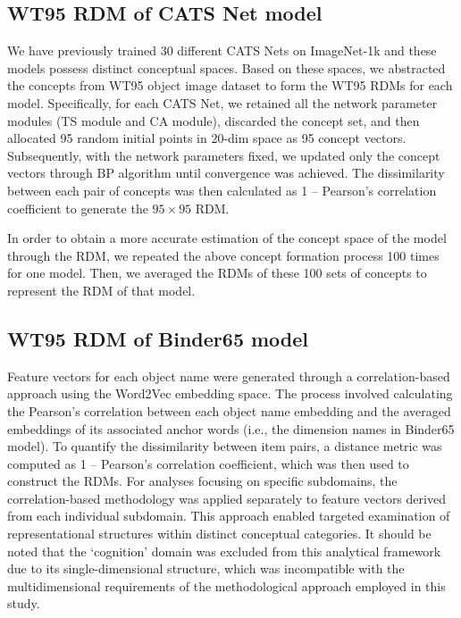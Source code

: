 \documentclass[pdflatex,sn-mathphys-num,lineno]{sn-jnl}%
\begin{document}
\begin{CJK}{UTF8}{gbsn}
\subsection{WT95 RDM of CATS Net model}
We have previously trained 30 different CATS Nets on ImageNet-1k and these models possess distinct conceptual spaces. Based on these spaces, we abstracted the concepts from WT95 object image dataset to form the WT95 RDMs for each model. Specifically, for each CATS Net, we retained all the network parameter modules (TS module and CA module), discarded the concept set, and then allocated 95 random initial points in 20-dim space as 95 concept vectors. Subsequently, with the network parameters fixed, we updated only the concept vectors through BP algorithm until convergence was achieved. The dissimilarity between each pair of concepts was then calculated as 1 – Pearson’s correlation coefficient to generate the $95\times95$ RDM. 

In order to obtain a more accurate estimation of the concept space of the model through the RDM, we repeated the above concept formation process 100 times for one model. Then, we averaged the RDMs of these 100 sets of concepts to represent the RDM of that model.

\subsection{WT95 RDM of Binder65 model}
Feature vectors for each object name were generated through a correlation-based approach using the Word2Vec embedding space. The process involved calculating the Pearson’s correlation between each object name embedding and the averaged embeddings of its associated anchor words (i.e., the dimension names in Binder65 model). To quantify the dissimilarity between item pairs, a distance metric was computed as 1 – Pearson’s correlation coefficient, which was then used to construct the RDMs. For analyses focusing on specific subdomains, the correlation-based methodology was applied separately to feature vectors derived from each individual subdomain. This approach enabled targeted examination of representational structures within distinct conceptual categories. It should be noted that the ‘cognition’ domain was excluded from this analytical framework due to its single-dimensional structure, which was incompatible with the multidimensional requirements of the methodological approach employed in this study.


\end{CJK}
\end{document}
